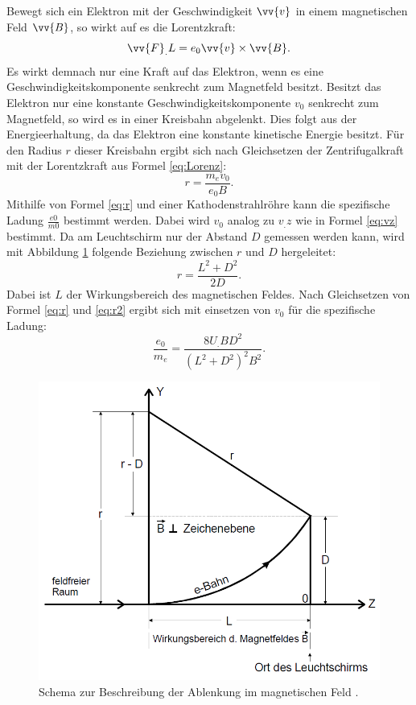 Bewegt sich ein Elektron mit der Geschwindigkeit $\vv{v}$ in einem magnetischen Feld $\vv{B}$, so wirkt auf es die Lorentzkraft:
\begin{equation}
\vv{F}_.L = e_0\vv{v}\times\vv{B}\text{.}\label{eq:Lorenz}
\end{equation}
Es wirkt demnach nur eine Kraft auf das Elektron, wenn es eine Geschwindigkeitskomponente senkrecht zum Magnetfeld besitzt.
Besitzt das Elektron nur eine konstante Geschwindigkeitskomponente $v_0$ senkrecht zum Magnetfeld, so wird es in einer Kreisbahn abgelenkt. Dies folgt aus der Energieerhaltung, da das Elektron eine konstante kinetische Energie besitzt. Für den Radius $r$ dieser Kreisbahn ergibt sich nach Gleichsetzen der Zentrifugalkraft mit der Lorentzkraft aus Formel \eqref{eq:Lorenz}:
\begin{equation}
r = \frac{m_ev_0}{e_0B}\text{.}\label{eq:r}
\end{equation}
Mithilfe von Formel \eqref{eq:r} und einer Kathodenstrahlröhre kann die spezifische Ladung $\frac{e0}{m0}$ bestimmt werden. Dabei wird $v_0$ analog zu $v_.z$ wie in Formel \eqref{eq:vz} bestimmt.
Da am Leuchtschirm nur der Abstand $D$ gemessen werden kann, wird mit Abbildung \ref{fig:B-Feld} folgende Beziehung zwischen $r$ und $D$ hergeleitet:
\begin{equation}
r = \frac{L^2+D^2}{2D}\text{.}\label{eq:r2}
\end{equation}
Dabei ist $L$ der Wirkungsbereich des magnetischen Feldes. Nach Gleichsetzen von Formel \eqref{eq:r} und \eqref{eq:r2} ergibt sich mit einsetzen von $v_0$ für die spezifische Ladung:
\begin{equation}
\frac{e_0}{m_e} = \frac{8U_.BD^2}{(L^2+D^2)^2B^2}\text{.}\label{eq:e0/me}
\end{equation}

\begin{figure}
\centering
\includegraphics[width=\linewidth-70pt,height=\textheight-70pt,keepaspectratio]{content/images/Ablenkung-Im-B-Feld.jpg}
\caption{Schema zur Beschreibung der Ablenkung im magnetischen Feld \cite{V502}.}
\label{fig:B-Feld}
\end{figure}